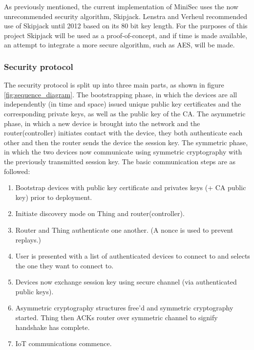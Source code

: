 \documentclass{mprop}
\begin{document}
As previously mentioned, the current implementation of MiniSec uses the now unrecommended security algorithm, Skipjack. Lenstra and Verheul recommended use of Skipjack until 2012 based on its 80 bit key length\cite{SkipjackRecommendation}. For the purposes of this project Skipjack will be used as a proof-of-concept, and if time is made available, an attempt to integrate a more secure algorithm, such as AES, will be made.


\subsubsection{Security protocol} %
\label{ssub:security_protocol}
The security protocol is split up into three main parts, as shown in figure \ref{fig:sequence_diagram}. The bootstrapping phase, in which the devices are all independently (in time and space) issued unique public key certificates and the corresponding private keys, as well as the public key of the CA. The asymmetric phase, in which a new device is brought into the network and the router(controller) initiates contact with the device, they both authenticate each other and then the router sends the device the session key. The symmetric phase, in which the two devices now communicate using symmetric cryptography with the previously transmitted session key.
The basic communication steps are as followed:
\begin{enumerate}
  \item Bootstrap devices with public key certificate and privates keys (+ CA public key) prior to deployment.
  \item Initiate discovery mode on Thing and router(controller).
  \item Router and Thing authenticate one another. (A nonce is used to prevent replays.)
  \item User is presented with a list of authenticated devices to connect to and selects the one they want to connect to.
  \item Devices now exchange session key using secure channel (via authenticated public keys).
  \item Asymmetric cryptography structures free'd and symmetric cryptography started. Thing then ACKs router over symmetric channel to signify handshake has complete.
  \item IoT communications commence.
\end{enumerate}
\end{document}
